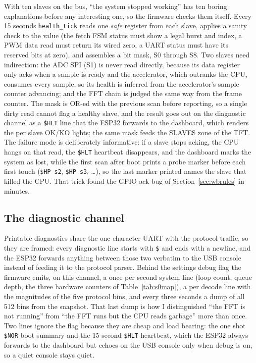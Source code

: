 \documentclass[a4paper,11pt]{article}
\begin{document}
With ten slaves on the bus, ``the system stopped working'' has ten boring
explanations before any interesting one, so the firmware checks them itself.
Every 15 seconds \texttt{health\_tick} reads one \emph{safe} register from each
slave, applies a sanity check to the value (the fetch FSM status must show a
legal burst and index, a PWM data read must return its wired zero, a UART
status must have its reserved bits at zero), and assembles a bit mask, S0
through S8. Two slaves need indirection: the ADC SPI (S1) is never read
directly, because its data register only acks when a sample is ready and the
accelerator, which outranks the CPU, consumes every sample, so its health is
inferred from the accelerator's sample counter advancing; and the FFT chain is
judged the same way from the frame counter. The mask is OR-ed with the previous
scan before reporting, so a single dirty read cannot flag a healthy slave, and
the result goes out on the diagnostic channel as a \texttt{\$HLT} line that the
ESP32 forwards to the dashboard, which renders the per slave OK/KO lights; the
same mask feeds the SLAVES zone of the TFT. The failure mode is deliberately
informative: if a slave stops acking, the CPU hangs on that read, the
\texttt{\$HLT} heartbeat disappears, and the dashboard marks the system as
lost, while the first scan after boot prints a probe marker before each first
touch (\texttt{\$HP s2}, \texttt{\$HP s3}, \dots), so the last marker printed
names the slave that killed the CPU. That trick found the GPIO ack bug of
Section~\ref{sec:wbrules} in minutes.

\subsection{The diagnostic channel}

Printable diagnostics share the one character UART with the protocol traffic, so
they are framed: every diagnostic line starts with \texttt{\$} and ends with a
newline, and the ESP32 forwards anything between those two verbatim to the USB
console instead of feeding it to the protocol parser. Behind the settings debug
flag the firmware emits, on this channel, a once per second system line (loop
count, queue depth, the three hardware counters of Table~\ref{tab:s0map}), a per
decode line with the magnitudes of the five protocol bins, and every three
seconds a dump of all 512 bins from the snapshot. That last dump is how I
distinguished ``the FFT is not running'' from ``the FFT runs but the CPU reads
garbage'' more than once. Two lines ignore the flag because they are cheap and
load bearing: the one shot \texttt{\$NOR} boot summary and the 15 second
\texttt{\$HLT} heartbeat, which the ESP32 always forwards to the dashboard but
echoes on the USB console only when debug is on, so a quiet console stays
quiet.
\end{document}
